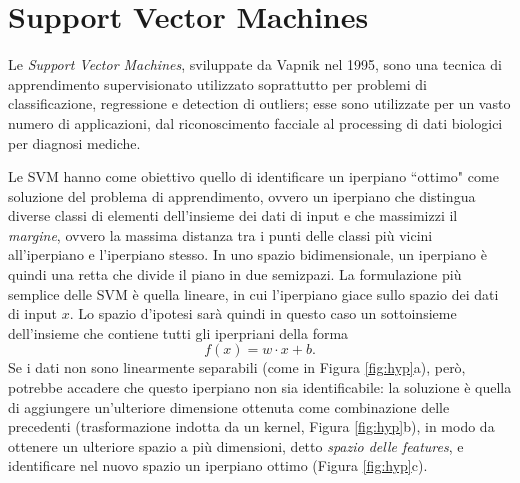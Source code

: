 \documentclass[oneside, openany]{book}
\begin{document}
	\section{Support Vector Machines}
	Le \textit{Support Vector Machines}, sviluppate da Vapnik nel 1995, sono una tecnica di apprendimento supervisionato utilizzato soprattutto per problemi di classificazione, regressione e detection di outliers; esse sono utilizzate per un vasto numero di applicazioni, dal riconoscimento facciale al processing di dati biologici per diagnosi mediche.
	
	Le SVM hanno come obiettivo quello di identificare un iperpiano ``ottimo" come soluzione del problema di apprendimento, ovvero un iperpiano che distingua diverse classi di elementi dell'insieme dei dati di input e che massimizzi il \textit{margine}, ovvero la massima distanza tra i punti delle classi più vicini all'iperpiano e l'iperpiano stesso. In uno spazio bidimensionale, un iperpiano è quindi una retta che divide il piano in due semizpazi. La formulazione più semplice delle SVM è quella lineare, in cui l'iperpiano giace sullo spazio dei dati di input $x$. Lo spazio d'ipotesi sarà quindi in questo caso un sottoinsieme dell'insieme che contiene tutti gli iperpriani della forma 
	\[
	f(x) = w\cdot x+b\text{.}
	\]
	Se i dati non sono linearmente separabili (come in Figura \ref{fig:hyp}a), però, potrebbe accadere che questo iperpiano non sia identificabile: la soluzione è quella di aggiungere un'ulteriore dimensione ottenuta come combinazione delle precedenti (trasformazione indotta da un kernel, Figura \ref{fig:hyp}b), in modo da ottenere un ulteriore spazio a più dimensioni, detto \textit{spazio delle features}, e identificare nel nuovo spazio un iperpiano ottimo (Figura \ref{fig:hyp}c).\\
\end{document}
